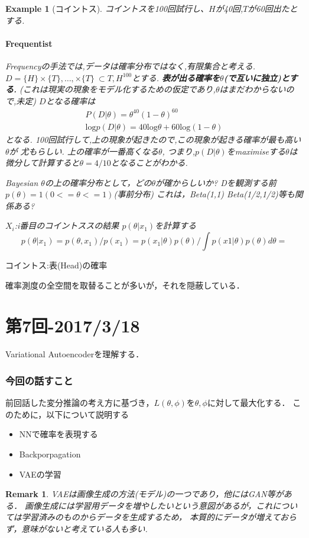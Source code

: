 \documentclass{ujarticle}
\newtheorem{epl}[thm]{Example}
\newtheorem*{rem}{Remark}
\begin{document}
\begin{epl}[コイントス]
コイントスを100回試行し、$H$が40回,$T$が60回出たとする.
\subsection{Frequentist}
\label{sub:Frequentist}
Frequencyの手法では,データは確率分布ではなく,有限集合と考える.
$D=\{H\} \times \{T\},…, \times \{T\}\ \subset {T,H}^{100} $とする.
\textbf{表が出る確率を$\theta$(で互いに独立)とする.}
(これは現実の現象をモデル化するための仮定であり,$\theta$はまだわからないので,未定)
$D$となる確率は
\begin{align*}
P(D|\theta)=\theta^40(1-\theta)^60 \\
\mathrm{log}p(D|\theta)=40\mathrm{log}\theta +60\mathrm{log}(1-\theta)
\end{align*}
となる.
100回試行して,上の現象が起きたので,この現象が起きる確率が最も高い$\theta$が
尤もらしい.
上の確率が一番高くなる$\theta$,
つまり,$p(D|\theta)$をmaximiseする$\theta$は
微分して計算すると$\theta=4/10$となることがわかる.

Bayesian $\theta$の上の確率分布として，どの$\theta$が確からしいか?
Dを観測する前 $p(\theta)=1(0 <=\theta<=1)$(事前分布)
これは，Beta(1,1)
Beta(1/2,1/2)等も関係ある?

$X_i$:i番目のコイントススの結果
 $p(\theta|x_1)$を計算する
 \begin{equation*}
 p(\theta|x_1)=p(\theta,x_1)/p(x_1)=p(x_1|\theta)p(\theta)/∫p(x1|\theta)p(\theta)d\theta
=
\end{equation*}
\end{epl} コイントス:表(Head)の確率


確率測度の全空間を取替ることが多いが，それを隠蔽している．


\part{第7回-2017/3/18}
\label{part:第7回-2017/3/18}

Variational Autoencoder\cite{Kingma Welling}を理解する．

\section{今回の話すこと}
\label{sec:今回の話すこと}
前回話した変分推論の考え方に基づき，$L(\theta,\phi)$を$\theta,\phi$に対して最大化する．
このために，以下について説明する
\begin{itemize}
  \item NNで確率を表現する
  \item Backporpagation
  \item VAEの学習
\end{itemize}
\begin{rem}
 VAEは画像生成の方法(モデル)の一つであり，他にはGAN等がある．
 画像生成には学習用データを増やしたいという意図があるが，これについては学習済みのものからデータを生成するため，
 本質的にデータが増えておらず，意味がないと考えている人も多い.
\end{rem}
\end{document}
